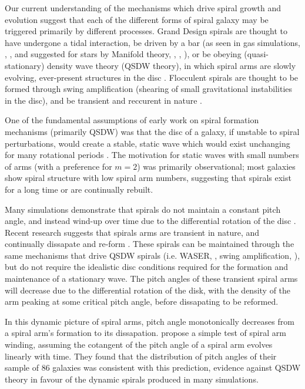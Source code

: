 Our current understanding of the mechanisms which drive spiral growth and evolution suggest that each of the different forms of spiral galaxy may be triggered primarily by different processes. Grand Design spirals are thought to have undergone a tidal interaction, be driven by a bar (as seen in gas simulations, \citealt{1976ApJ...209...53S}, \citealt{2008A&A...489..115R}, and suggested for stars by Manifold theory, \citealt{2006A&A...453...39R}, \citealt{2009MNRAS.394...67A}, \citealt{2009MNRAS.400.1706A}), or be obeying (quasi-stationary) density wave theory (QSDW theory), in which spiral arms are slowly evolving, ever-present structures in the disc \citep{1964ApJ...140..646L}. Flocculent spirals are thought to be formed through swing amplification (shearing of small gravitational instabilities in the disc), and be transient and reccurent in nature \citep{1966ApJ...146..810J}.

One of the fundamental assumptions of early work on spiral formation mechanisms (primarily QSDW) was that the disc of a galaxy, if unstable to spiral perturbations, would create a stable, static wave which would exist unchanging for many rotational periods \citep{1964ApJ...140..646L}. The motivation for static waves with small numbers of arms (with a preference for $m=2$) was primarily observational; most galaxies show spiral structure with low spiral arm numbers, suggesting that spirals exist for a long time or are continually rebuilt.

Many simulations demonstrate that spirals do not maintain a constant pitch angle, and instead wind-up over time due to the differential rotation of the disc \citep{2013ApJ...763...46B}. Recent research suggests that spirals arms are transient in nature, and continually dissapate and re-form \citep{2014PASA...31...35D}. These spirals can be maintained through the same mechanisms that drive QSDW spirals (i.e. WASER, \citealt{1976ApJ...205..363M}, swing amplification, \citealt{1965MNRAS.130..125G}), but do not require the idealistic disc conditions required for the formation and maintenance of a stationary wave. The pitch angles of these transient spiral arms will decrease due to the differential rotation of the disk, with the density of the arm peaking at some critical pitch angle, before dissapating to be reformed.

In this dynamic picture of spiral arms, pitch angle monotonically decreases from a spiral arm's formation to its dissapation. \citet{2019arXiv190910291P} propose a simple test of spiral arm winding, assuming the cotangent of the pitch angle of a spiral arm evolves linearly with time. They found that the distribution of pitch angles of their sample of 86 galaxies was consistent with this prediction, evidence against QSDW theory in favour of the dynamic spirals produced in many simulations.

